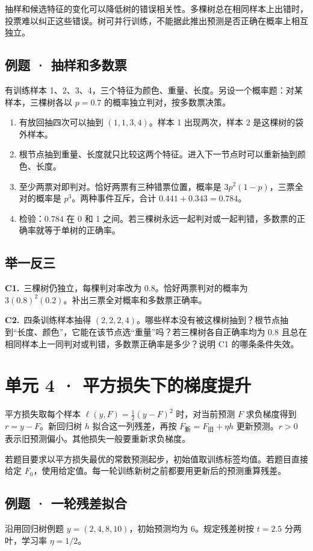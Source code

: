 \documentclass[UTF8,a4paper,11pt]{ctexart}
\newcommand{\CompactQuestion}[2]{\par\noindent\textbf{#1.}\ #2\par\vspace{.8em}}
\begin{document}
抽样和候选特征的变化可以降低树的错误相关性。多棵树总在相同样本上出错时，投票难以纠正这些错误。树可并行训练，不能据此推出预测是否正确在概率上相互独立。

\subsection{例题 · 抽样和多数票}
有训练样本 1、2、3、4，三个特征为颜色、重量、长度。另设一个概率题：对某样本，三棵树各以 $p=0.7$ 的概率独立判对，按多数票决策。

\begin{enumerate}
\item 有放回抽四次可以抽到 $(1,1,3,4)$。样本 1 出现两次，样本 2 是这棵树的袋外样本。
\item 根节点抽到重量、长度就只比较这两个特征。进入下一节点时可以重新抽到颜色、长度。
\item 至少两票对即判对。恰好两票有三种错票位置，概率是 $3p^2(1-p)$，三票全对的概率是 $p^3$。两种事件互斥，合计 $0.441+0.343=0.784$。
\item 检验：$0.784$ 在 0 和 1 之间。若三棵树永远一起判对或一起判错，多数票的正确率就等于单树的正确率。
\end{enumerate}
\subsection{举一反三}
\CompactQuestion{C1}{三棵树仍独立，每棵判对率改为 0.8。恰好两票判对的概率为 $3(0.8)^2(0.2)$。补出三票全对概率和多数票正确率。}
\CompactQuestion{C2}{四条训练样本抽得 $(2,2,2,4)$。哪些样本没有被这棵树抽到？根节点抽到“长度、颜色”，它能在该节点选“重量”吗？若三棵树各自正确率均为 0.8 且总在相同样本上一同判对或判错，多数票正确率是多少？说明 C1 的哪条条件失效。}
\clearpage
\section{单元 4 · 平方损失下的梯度提升}
平方损失取每个样本 $\ell(y,F)=\tfrac12(y-F)^2$ 时，对当前预测 $F$ 求负梯度得到 $r=y-F$。新回归树 $h$ 拟合这一列残差，再按 $F_{\text{新}}=F_{\text{旧}}+\eta h$ 更新预测。$r>0$ 表示旧预测偏小。其他损失一般要重新求负梯度。

若题目要求以平方损失最优的常数预测起步，初始值取训练标签均值。若题目直接给定 $F_0$，使用给定值。每一轮训练新树之前都要用更新后的预测重算残差。

\subsection{例题 · 一轮残差拟合}
沿用回归树例题 $y=(2,4,8,10)$，初始预测均为 6。规定残差树按 $t=2.5$ 分两叶，学习率 $\eta=1/2$。
\end{document}
